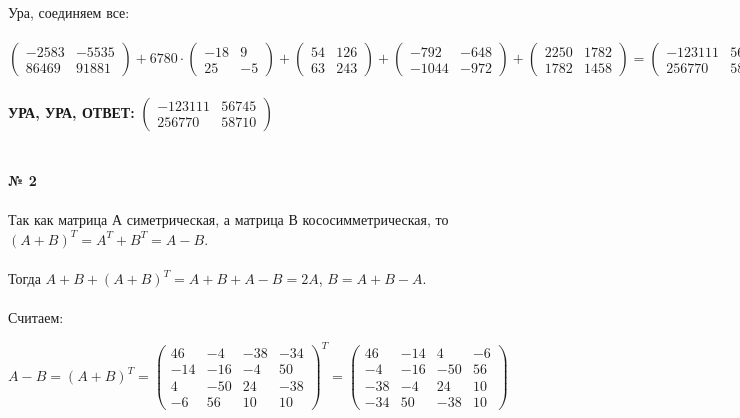 \documentclass[a4paper, 12pt]{article}
\begin{document}
    \\
    \\ Ура, соединяем все:
    \\
    \\ $\begin{pmatrix}-2583 & -5535\\86469 & 91881\end{pmatrix}  + 6780 \cdot \begin{pmatrix}-18 & 9\\25 & -5\end{pmatrix} + \begin{pmatrix}54 & 126\\63 & 243\end{pmatrix} + \begin{pmatrix}-792 & -648\\-1044 & -972\end{pmatrix} + \begin{pmatrix}2250 & 1782\\1782 & 1458\end{pmatrix} = \begin{pmatrix}-123111 & 56745\\256770 & 58710\end{pmatrix}$
    \\
    \\ \textbf{УРА, УРА, ОТВЕТ: } $\begin{pmatrix}-123111 & 56745\\256770 & 58710\end{pmatrix}$
    \\\\
    \\ \textbf{№ 2}
    \\ 
    \\ Так как матрица А симетрическая, а матрица В кососимметрическая, то $(A + B)^T = A^T + B^T = A - B$.
    \\
    \\ Тогда $A + B + (A + B)^T = A + B + A - B = 2A$, $B = A + B - A$.
    \\
    \\ Считаем:
    \\
    \par $A - B = (A + B)^T = \begin{pmatrix}46 & -4 & -38 & -34\\ -14 & -16 & -4 & 50\\ 4 & -50 & 24 & -38 \\ -6 & 56 & 10 & 10\end{pmatrix}^T = \begin{pmatrix}46 & -14 & 4 & -6\\-4 & -16 & -50 & 56\\-38 & -4 & 24 & 10\\-34 & 50 & -38 & 10\end{pmatrix}$
\end{document}
